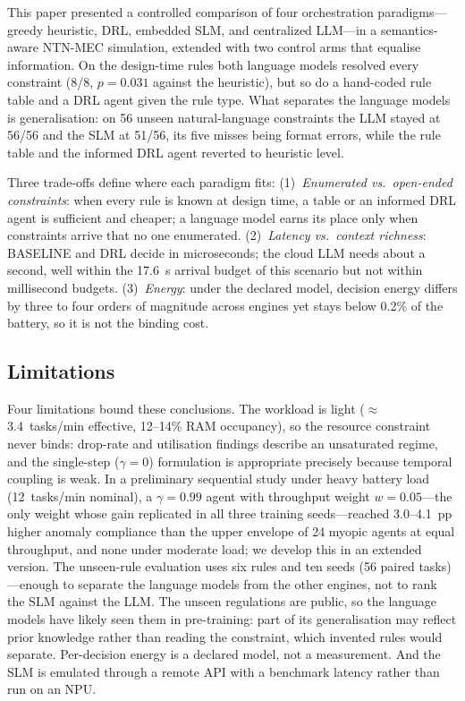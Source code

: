 \documentclass[conference,comsoc,twoside,caption=false]{IEEEtran}
\theoremstyle{definition}
\begin{document}
This paper presented a controlled comparison of four orchestration
paradigms---greedy heuristic, DRL, embedded \ac{SLM}, and centralized
\ac{LLM}---in a semantics-aware NTN-MEC simulation, extended with two control
arms that equalise information. On the design-time rules both language models
resolved every constraint (8/8, $p=0.031$ against the heuristic), but so do a
hand-coded rule table and a DRL agent given the rule type. What separates the
language models is generalisation: on 56 unseen natural-language constraints the
LLM stayed at 56/56 and the SLM at 51/56, its five misses being format errors,
while the rule table and the informed DRL agent reverted to heuristic level.

Three trade-offs define where each paradigm fits:
(1)~\emph{Enumerated vs.\ open-ended constraints}: when every rule is known at
design time, a table or an informed DRL agent is sufficient and cheaper; a
language model earns its place only when constraints arrive that no one
enumerated.
(2)~\emph{Latency vs.\ context richness}: BASELINE and DRL decide in
microseconds; the cloud LLM needs about a second, well within the 17.6~s arrival
budget of this scenario but not within millisecond budgets.
(3)~\emph{Energy}: under the declared model, decision energy differs by three to
four orders of magnitude across engines yet stays below 0.2\% of the battery,
so it is not the binding cost.

\subsection*{Limitations}
Four limitations bound these conclusions. The workload is light
($\approx$3.4~tasks/min effective, 12--14\% RAM occupancy), so the resource constraint never
binds: drop-rate and utilisation findings describe an unsaturated regime, and the
single-step ($\gamma=0$) formulation is appropriate precisely because temporal
coupling is weak. In a preliminary sequential study under heavy battery load
(12~tasks/min nominal), a $\gamma=0.99$ agent with throughput weight $w=0.05$---the
only weight whose gain replicated in all three training seeds---reached
3.0--4.1~pp higher anomaly compliance than the upper envelope of 24 myopic agents
at equal throughput, and none under moderate load; we develop this in an
extended version. The unseen-rule evaluation uses six rules and ten seeds (56 paired
tasks)---enough to separate the language models from the other engines, not to
rank the SLM against the LLM. The unseen regulations are public, so the language models have likely seen
them in pre-training: part of its generalisation may reflect prior knowledge rather than
reading the constraint, which invented rules would separate. Per-decision energy is a declared model, not a
measurement. And the SLM is emulated through a remote API with a benchmark
latency rather than run on an NPU.
\end{document}
